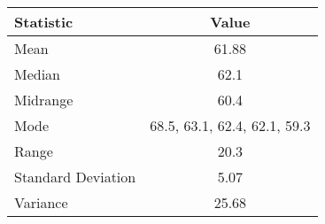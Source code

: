 \begin{tabular}{l c}
  \hline
  Statistic & Value \\
  \hline
  Mean & 61.88 \\
  Median & 62.1 \\
  Midrange & 60.4 \\
  Mode & 68.5, 63.1, 62.4, 62.1, 59.3 \\
  Range & 20.3 \\
  Standard Deviation & 5.07 \\
  Variance & 25.68 \\
  \hline
\end{tabular}
